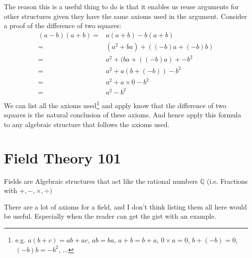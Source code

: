 The reason this is a useful thing to do is that it enables us reuse arguments for other structures given they have the same axioms used in the argument. 
Consider a proof of the difference of two squares:
\begin{equation*}
\begin{aligned}
	(a-b)(a+b) =& a(a+b)-b(a+b) \\
	=& (a^2+ba)+((-b)a+(-b)b) \\
	=& a^2+(ba+((-b)a)+-b^2 \\
	=& a^2+a(b+(-b))-b^2 \\
	=& a^2+a\times 0-b^2 \\
	=& a^2-b^2 \\
\end{aligned}
\end{equation*}
We can list all the axioms used\footnote{e.g. $a(b+c) = ab+ac$, $ab=ba$, $a+b = b+a$, $0\times a = 0$, $b+(-b) = 0$, $(-b)b = -b^2$, ...} and apply know that the difference of two squares is the natural conclusion of these axioms.
And hence apply this formula to any algebraic structure that follows the axioms used.

\section{Field Theory 101}
\begin{displayquote}
Fields are Algebraic structures that act like the rational numbers $\mathbb{Q}$ (i.e. Fractions with $+,-,\times,\div)$
\end{displayquote}
There are a lot of axioms for a field,
and I don't think listing them all here would be useful.
Especially when the reader can get the gist with an example.
\\

